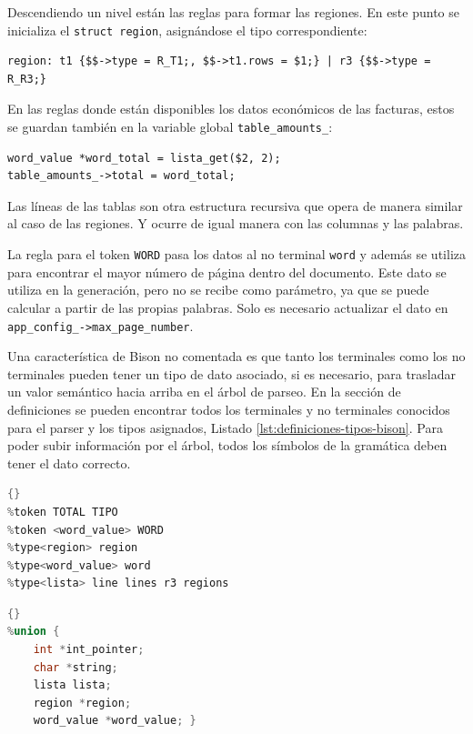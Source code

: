 Descendiendo un nivel están las reglas para formar las regiones. En este punto se inicializa el \verb|struct region|, asignándose el tipo correspondiente:

\begin{lstlisting}[caption={},label={lst:guardando-regiones}]
region: t1 {$$->type = R_T1;, $$->t1.rows = $1;} | r3 {$$->type = R_R3;}
\end{lstlisting}

En las reglas donde están disponibles los datos económicos de las facturas, estos se guardan también en la variable global \verb|table_amounts_|:

\begin{lstlisting}[caption={},label={}]
word_value *word_total = lista_get($2, 2);
table_amounts_->total = word_total;
\end{lstlisting}

Las líneas de las tablas son otra estructura recursiva que opera de manera similar al caso de las regiones. Y ocurre de igual manera con las columnas y las palabras.

La regla para el token \verb|WORD| pasa los datos al no terminal \verb|word| y además se utiliza para encontrar el mayor número de página dentro del documento. Este dato se utiliza en la generación, pero no se recibe como parámetro, ya que se puede calcular a partir de las propias palabras. Solo es necesario actualizar el dato en \verb|app_config_->max_page_number|.

Una característica de Bison no comentada es que tanto los terminales como los no terminales pueden tener un tipo de dato asociado, si es necesario, para trasladar un valor semántico hacia arriba en el árbol de parseo. En la sección de definiciones se pueden encontrar todos los terminales y no terminales conocidos para el parser y los tipos asignados, Listado \ref{lst:definiciones-tipos-bison}. Para poder subir información por el árbol, todos los símbolos de la gramática deben tener el dato correcto.

\noindent\begin{minipage}{.45\textwidth}
    \begin{lstlisting}[language=C,caption={Definiciones de tipos para tokens y no terminales},label={lst:definiciones-tipos-bison}]{}
%token TOTAL TIPO
%token <word_value> WORD
%type<region> region
%type<word_value> word
%type<lista> line lines r3 regions
    \end{lstlisting}
\end{minipage}\hfill
\begin{minipage}{.45\textwidth}
    \begin{lstlisting}[language=C,caption={Tipo de variables compartidas entre Bison y Flex},label={lst:union-variables-compartidas}]{}
%union {
    int *int_pointer;
    char *string;
    lista lista;
    region *region;
    word_value *word_value; }
    \end{lstlisting}
\end{minipage}

